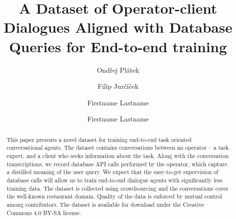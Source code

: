 \documentclass[runningheads,a4paper]{llncs}
\def\OP#1{#1}  %
\begin{document}


\title{A Dataset of Operator-client Dialogues Aligned with Database Queries for End-to-end training}

\author{Ondřej Plátek \and Filip Jurčíček}

\iftrue %
\author{Firstname Lastname \and Firstname Lastname }
\fi
			
\maketitle

\begin{abstract}
    This paper presents a novel dataset for training end-to-end task oriented conversational agents.
    The dataset contains conversations between an operator – a task expert, and a client who seeks information about the task.
    Along with the conversation transcriptions, we record database API calls performed by the operator, which capture a distilled meaning of the user query.
    We expect that the easy-to-get supervision of database calls will allow us to train end-to-end dialogue agents with significantly less training data.
 	The dataset is collected using crowdsourcing and the conversations cover the well-known restaurant domain.
    Quality of the data is enforced by mutual control among contributors.  %
    The dataset is available for download under the Creative Commons 4.0 BY-SA license.
\end{abstract}

\vspace{-1.00em}
\vspace{-1.00em}
\end{document}
